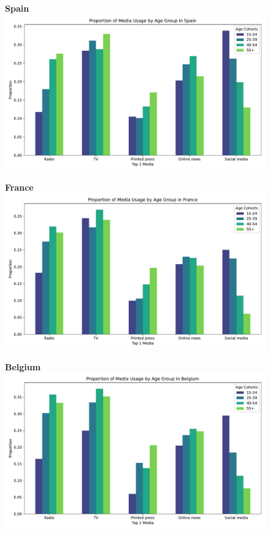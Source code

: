 \documentclass[12pt]{article}
\begin{document}
	
	\begin{figure}[h!]
		\centering
		\begin{minipage}[b]{0.45\textwidth}
			\centering
			\textbf{ Spain}
			\includegraphics[width=\textwidth]{figures/media_es}
		\end{minipage}
		\hfill
		\begin{minipage}[b]{0.45\textwidth}
			\centering
			\textbf{ France}
			\includegraphics[width=\textwidth]{figures/media_fr}
		\end{minipage}
		\vfill
		\begin{minipage}[b]{0.45\textwidth}
			\centering
			\textbf{ Belgium}
			\includegraphics[width=\textwidth]{figures/media_be}

\end{minipage}
\end{figure}
\end{document}
